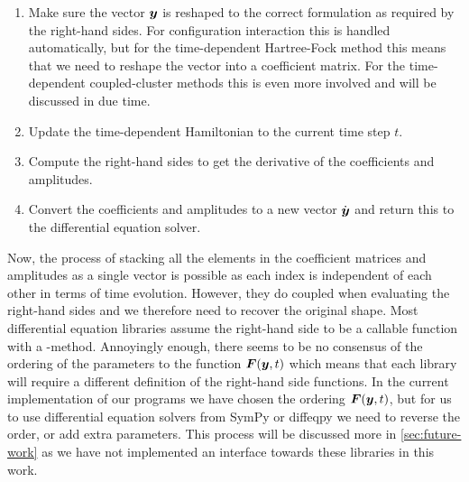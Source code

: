             \begin{enumerate}
                \item Make sure the vector $\boldsymbol{y}$ is reshaped to the correct
                    formulation as required by the right-hand sides.
                    For configuration interaction this is handled automatically,
                    but for the time-dependent Hartree-Fock method this means
                    that we need to reshape the vector into a coefficient
                    matrix.
                    For the time-dependent coupled-cluster methods this is even
                    more involved and will be discussed in due time.
                \item Update the time-dependent Hamiltonian to the current time
                    step $t$.
                \item Compute the right-hand sides to get the derivative of the
                    coefficients and amplitudes.
                \item Convert the coefficients and amplitudes to a new vector
                    $\dot{\boldsymbol{y}}$ and return this to the differential
                    equation solver.
            \end{enumerate}
            Now, the process of stacking all the elements in the coefficient
            matrices and amplitudes as a single vector is possible as each index
            is independent of each other in terms of time evolution.
            However, they do coupled when evaluating the right-hand sides and we
            therefore need to recover the original shape.
            Most differential equation libraries \cite{sympy} \cite{julia-diff}
            assume the right-hand side to be a callable function with a
            -method.
            Annoyingly enough, there seems to be no consensus of the ordering of
            the parameters to the function $\boldsymbol{F}(\boldsymbol{y}, t)$ which means
            that each library will require a different definition of the
            right-hand side functions.
            In the current implementation of our programs we have chosen the
            ordering $\boldsymbol{F}(\boldsymbol{y}, t)$, but for us to use differential
            equation solvers from SymPy \cite{sympy} or diffeqpy
            \cite{julia-diff} we need to reverse the order, or add extra
            parameters.
            This process will be discussed more in \autoref{sec:future-work} as
            we have not implemented an interface towards these libraries in this
            work.

